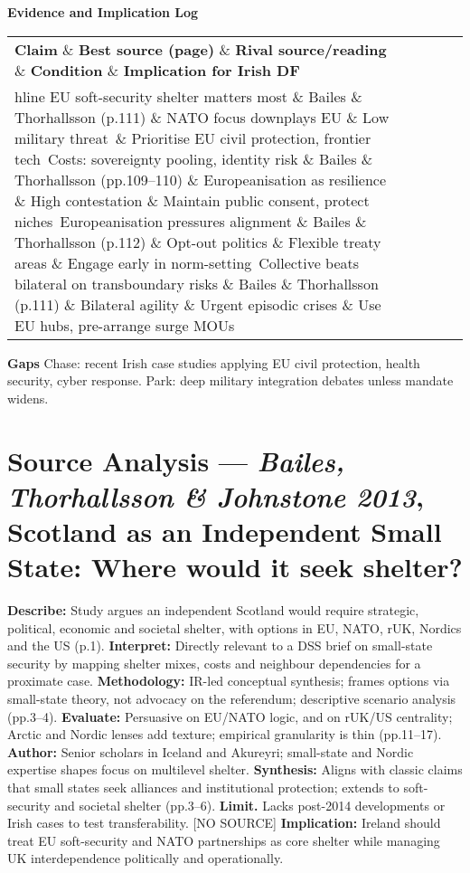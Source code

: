 \textbf{Evidence and Implication Log}
\begin{tabular}{p{3.2cm}p{4.2cm}p{3.6cm}p{3.2cm}p{4.2cm}}
	\textbf{Claim} \& \textbf{Best source (page)} \& \textbf{Rival source/reading} \& \textbf{Condition} \& \textbf{Implication for Irish DF}\\hline
	EU soft-security shelter matters most \& Bailes \& Thorhallsson (p.111)  \& NATO focus downplays EU \& Low military threat\ \& Prioritise EU civil protection, frontier tech\
	Costs: sovereignty pooling, identity risk \& Bailes \& Thorhallsson (pp.109–110)  \& Europeanisation as resilience \& High contestation \& Maintain public consent, protect niches\
	Europeanisation pressures alignment \& Bailes \& Thorhallsson (p.112)  \& Opt-out politics \& Flexible treaty areas \& Engage early in norm-setting\
	Collective beats bilateral on transboundary risks \& Bailes \& Thorhallsson (p.111)  \& Bilateral agility \& Urgent episodic crises \& Use EU hubs, pre-arrange surge MOUs\
\end{tabular}

\textbf{Gaps}
Chase: recent Irish case studies applying EU civil protection, health security, cyber response.
Park: deep military integration debates unless mandate widens.


\parencite{BAILES_2013}

\section*{Source Analysis — \textit{Bailes, Thorhallsson \& Johnstone 2013}, Scotland as an Independent Small State: Where would it seek shelter?}
\textbf{Describe:} Study argues an independent Scotland would require strategic, political, economic and societal shelter, with options in EU, NATO, rUK, Nordics and the US (p.1).
\textbf{Interpret:} Directly relevant to a DSS brief on small-state security by mapping shelter mixes, costs and neighbour dependencies for a proximate case.
\textbf{Methodology:} IR-led conceptual synthesis; frames options via small-state theory, not advocacy on the referendum; descriptive scenario analysis (pp.3–4).
\textbf{Evaluate:} Persuasive on EU/NATO logic, and on rUK/US centrality; Arctic and Nordic lenses add texture; empirical granularity is thin (pp.11–17).
\textbf{Author:} Senior scholars in Iceland and Akureyri; small-state and Nordic expertise shapes focus on multilevel shelter.
\textbf{Synthesis:} Aligns with classic claims that small states seek alliances and institutional protection; extends to soft-security and societal shelter (pp.3–6).
\textbf{Limit.} Lacks post-2014 developments or Irish cases to test transferability. [NO SOURCE]
\textbf{Implication:} Ireland should treat EU soft-security and NATO partnerships as core shelter while managing UK interdependence politically and operationally.

